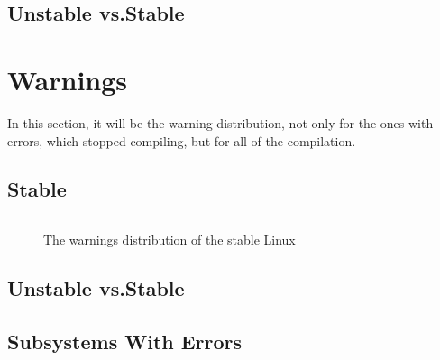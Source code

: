 \documentclass[a4paper,11pt]{report}
\newcommand{\figa}{
    \begin{figure}[!htpb]
    \centering
}
\newcommand{\figb}[2]{
    \caption{#1}
    \label{#2}
    \end{figure}
}
\begin{document}
    \subsection{Unstable vs.Stable}


    \section{Warnings}

In this section, it will be the warning distribution, not only for the ones 
with errors, which stopped compiling, but for all of the compilation.


    \subsection{Stable}

\figa
    \begin{tabular}{c|c}

    \end{tabular}
\figb{The warnings distribution of the stable Linux}{tab:stablewarn}


    \subsection{Unstable vs.Stable}


    \subsection{Subsystems With Errors}
\end{document}
